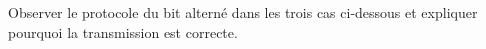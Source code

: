 \documentclass[a4paper,dvipsnames]{article}
\begin{document}
\begin{exercice}[breakable]{}{}

  Observer le protocole du bit alterné dans les trois cas ci-dessous et expliquer pourquoi la transmission est correcte.

  \begin{center}
  \end{center}

  \begin{center}
  \end{center}


\end{exercice}
\end{document}
